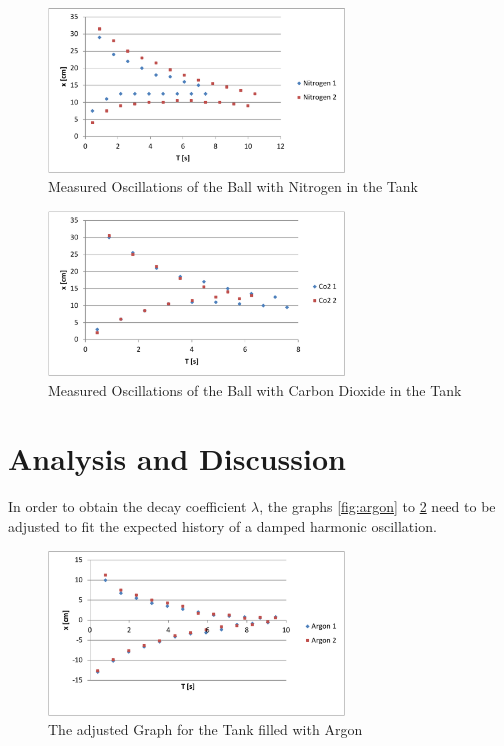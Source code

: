 \documentclass{scrreprt}
\begin{document}
\begin{figure}[H]
	\centering
  \includegraphics[width=0.7\textwidth]{diag/nitrogen.pdf}
	\caption{Measured Oscillations of the Ball with Nitrogen in the Tank}
	\label{fig:nitrogen}
\end{figure}

\begin{figure}[H]
	\centering
  \includegraphics[width=0.7\textwidth]{diag/co2.pdf}
	\caption{Measured Oscillations of the Ball with Carbon Dioxide in the Tank}
	\label{fig:co2}
\end{figure}

\newpage
\section{Analysis and Discussion}
In order to obtain the decay coefficient $\lambda$, the graphs \ref{fig:argon} to \ref{fig:co2} need to be adjusted to fit the expected history of a damped harmonic oscillation. 

\begin{figure}[H]
	\centering
  \includegraphics[width=0.7\textwidth]{diag/argon_adjusted.pdf}
	\caption{The adjusted Graph for the Tank filled with Argon}
	\label{fig:argon_adjusted}
\end{figure}
\end{document}
